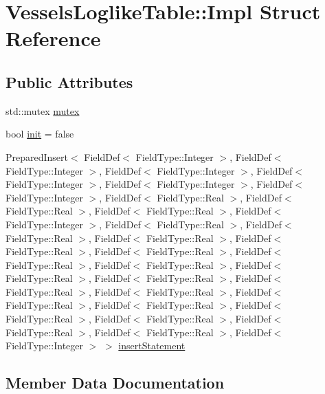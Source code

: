 \hypertarget{struct_vessels_loglike_table_1_1_impl}{}\section{Vessels\+Loglike\+Table\+::Impl Struct Reference}
\label{struct_vessels_loglike_table_1_1_impl}
\subsection*{Public Attributes}
\begin{DoxyCompactItemize}
\item 
std\+::mutex \mbox{\hyperlink{struct_vessels_loglike_table_1_1_impl_a943b01b1bd9f6590130c42b66b7a4b5b}{mutex}}
\item 
bool \mbox{\hyperlink{struct_vessels_loglike_table_1_1_impl_a6035a698d19d501968e1f331bfd66b1b}{init}} = false
\item 
Prepared\+Insert$<$ Field\+Def$<$ Field\+Type\+::\+Integer $>$, Field\+Def$<$ Field\+Type\+::\+Integer $>$, Field\+Def$<$ Field\+Type\+::\+Integer $>$, Field\+Def$<$ Field\+Type\+::\+Integer $>$, Field\+Def$<$ Field\+Type\+::\+Integer $>$, Field\+Def$<$ Field\+Type\+::\+Integer $>$, Field\+Def$<$ Field\+Type\+::\+Real $>$, Field\+Def$<$ Field\+Type\+::\+Real $>$, Field\+Def$<$ Field\+Type\+::\+Real $>$, Field\+Def$<$ Field\+Type\+::\+Integer $>$, Field\+Def$<$ Field\+Type\+::\+Real $>$, Field\+Def$<$ Field\+Type\+::\+Real $>$, Field\+Def$<$ Field\+Type\+::\+Real $>$, Field\+Def$<$ Field\+Type\+::\+Real $>$, Field\+Def$<$ Field\+Type\+::\+Real $>$, Field\+Def$<$ Field\+Type\+::\+Real $>$, Field\+Def$<$ Field\+Type\+::\+Real $>$, Field\+Def$<$ Field\+Type\+::\+Real $>$, Field\+Def$<$ Field\+Type\+::\+Real $>$, Field\+Def$<$ Field\+Type\+::\+Real $>$, Field\+Def$<$ Field\+Type\+::\+Real $>$, Field\+Def$<$ Field\+Type\+::\+Real $>$, Field\+Def$<$ Field\+Type\+::\+Real $>$, Field\+Def$<$ Field\+Type\+::\+Real $>$, Field\+Def$<$ Field\+Type\+::\+Real $>$, Field\+Def$<$ Field\+Type\+::\+Real $>$, Field\+Def$<$ Field\+Type\+::\+Real $>$, Field\+Def$<$ Field\+Type\+::\+Integer $>$ $>$ \mbox{\hyperlink{struct_vessels_loglike_table_1_1_impl_aa802635b7c589cd6916681024f7df0fd}{insert\+Statement}}
\end{DoxyCompactItemize}


\subsection{Member Data Documentation}
\mbox{\label{struct_vessels_loglike_table_1_1_impl_a6035a698d19d501968e1f331bfd66b1b}} 
